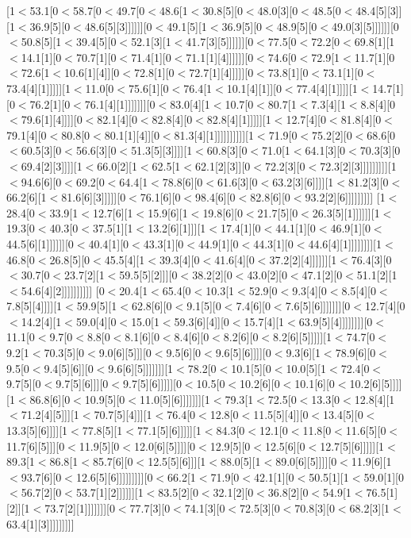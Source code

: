 [1$<$53.1[0$<$58.7[0$<$49.7[0$<$48.6[1$<$30.8[5][0$<$48.0[3][0$<$48.5[0$<$48.4[5][3]][1$<$36.9[5][0$<$48.6[5][3]]]]]][0$<$49.1[5][1$<$36.9[5][0$<$48.9[5][0$<$49.0[3][5]]]]]][0$<$50.8[5][1$<$39.4[5][0$<$52.1[3][1$<$41.7[3][5]]]]]][0$<$77.5[0$<$72.2[0$<$69.8[1][1$<$14.1[1][0$<$70.7[1][0$<$71.4[1][0$<$71.1[1][4]]]]]][0$<$74.6[0$<$72.9[1$<$11.7[1][0$<$72.6[1$<$10.6[1][4]][0$<$72.8[1][0$<$72.7[1][4]]]]][0$<$73.8[1][0$<$73.1[1][0$<$73.4[4][1]]]]][1$<$11.0[0$<$75.6[1][0$<$76.4[1$<$10.1[4][1]][0$<$77.4[4][1]]]][1$<$14.7[1][0$<$76.2[1][0$<$76.1[4][1]]]]]]][0$<$83.0[4][1$<$10.7[0$<$80.7[1$<$7.3[4][1$<$8.8[4][0$<$79.6[1][4]]]][0$<$82.1[4][0$<$82.8[4][0$<$82.8[4][1]]]]][1$<$12.7[4][0$<$81.8[4][0$<$79.1[4][0$<$80.8[0$<$80.1[1][4]][0$<$81.3[4][1]]]]]]]]]][1$<$71.9[0$<$75.2[2][0$<$68.6[0$<$60.5[3][0$<$56.6[3][0$<$51.3[5][3]]]][1$<$60.8[3][0$<$71.0[1$<$64.1[3][0$<$70.3[3][0$<$69.4[2][3]]]][1$<$66.0[2][1$<$62.5[1$<$62.1[2][3]][0$<$72.2[3][0$<$72.3[2][3]]]]]]]]][1$<$94.6[6][0$<$69.2[0$<$64.4[1$<$78.8[6][0$<$61.6[3][0$<$63.2[3][6]]]][1$<$81.2[3][0$<$66.2[6][1$<$81.6[6][3]]]]][0$<$76.1[6][0$<$98.4[6][0$<$82.8[6][0$<$93.2[2][6]]]]]]]]]
[1$<$28.4[0$<$33.9[1$<$12.7[6][1$<$15.9[6][1$<$19.8[6][0$<$21.7[5][0$<$26.3[5][1]]]]]][1$<$19.3[0$<$40.3[0$<$37.5[1][1$<$13.2[6][1]]][1$<$17.4[1][0$<$44.1[1][0$<$46.9[1][0$<$44.5[6][1]]]]]][0$<$40.4[1][0$<$43.3[1][0$<$44.9[1][0$<$44.3[1][0$<$44.6[4][1]]]]]]]][1$<$46.8[0$<$26.8[5][0$<$45.5[4][1$<$39.3[4][0$<$41.6[4][0$<$37.2[2][4]]]]]][1$<$76.4[3][0$<$30.7[0$<$23.7[2][1$<$59.5[5][2]]][0$<$38.2[2][0$<$43.0[2][0$<$47.1[2][0$<$51.1[2][1$<$54.6[4][2]]]]]]]]]]
[0$<$20.4[1$<$65.4[0$<$10.3[1$<$52.9[0$<$9.3[4][0$<$8.5[4][0$<$7.8[5][4]]]][1$<$59.9[5][1$<$62.8[6][0$<$9.1[5][0$<$7.4[6][0$<$7.6[5][6]]]]]]][0$<$12.7[4][0$<$14.2[4][1$<$59.0[4][0$<$15.0[1$<$59.3[6][4]][0$<$15.7[4][1$<$63.9[5][4]]]]]]]][0$<$11.1[0$<$9.7[0$<$8.8[0$<$8.1[6][0$<$8.4[6][0$<$8.2[6][0$<$8.2[6][5]]]]][1$<$74.7[0$<$9.2[1$<$70.3[5][0$<$9.0[6][5]]][0$<$9.5[6][0$<$9.6[5][6]]]][0$<$9.3[6][1$<$78.9[6][0$<$9.5[0$<$9.4[5][6]][0$<$9.6[6][5]]]]]]][1$<$78.2[0$<$10.1[5][0$<$10.0[5][1$<$72.4[0$<$9.7[5][0$<$9.7[5][6]]][0$<$9.7[5][6]]]]][0$<$10.5[0$<$10.2[6][0$<$10.1[6][0$<$10.2[6][5]]]][1$<$86.8[6][0$<$10.9[5][0$<$11.0[5][6]]]]]]][1$<$79.3[1$<$72.5[0$<$13.3[0$<$12.8[4][1$<$71.2[4][5]]][1$<$70.7[5][4]]][1$<$76.4[0$<$12.8[0$<$11.5[5][4]][0$<$13.4[5][0$<$13.3[5][6]]]][1$<$77.8[5][1$<$77.1[5][6]]]]][1$<$84.3[0$<$12.1[0$<$11.8[0$<$11.6[5][0$<$11.7[6][5]]][0$<$11.9[5][0$<$12.0[6][5]]]][0$<$12.9[5][0$<$12.5[6][0$<$12.7[5][6]]]]][1$<$89.3[1$<$86.8[1$<$85.7[6][0$<$12.5[5][6]]][1$<$88.0[5][1$<$89.0[6][5]]]][0$<$11.9[6][1$<$93.7[6][0$<$12.6[5][6]]]]]]]]][0$<$66.2[1$<$71.9[0$<$42.1[1][0$<$50.5[1][1$<$59.0[1][0$<$56.7[2][0$<$53.7[1][2]]]]]][1$<$83.5[2][0$<$32.1[2][0$<$36.8[2][0$<$54.9[1$<$76.5[1][2]][1$<$73.7[2][1]]]]]]][0$<$77.7[3][0$<$74.1[3][0$<$72.5[3][0$<$70.8[3][0$<$68.2[3][1$<$63.4[1][3]]]]]]]]]
